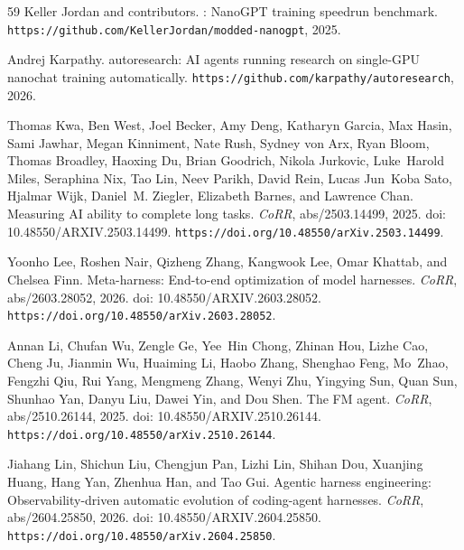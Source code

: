 \documentclass{llmxive}
\providecommand{\url}[1]{\texttt{#1}}
\providecommand{\doi}[1]{doi: #1}
\begin{document}
\begin{thebibliography}{59}
Keller Jordan and contributors.
: {NanoGPT} training speedrun benchmark.
\newblock \url{https://github.com/KellerJordan/modded-nanogpt}, 2025.

Andrej Karpathy.
\newblock autoresearch: {AI} agents running research on single-{GPU} nanochat training automatically.
\newblock \url{https://github.com/karpathy/autoresearch}, 2026.

Thomas Kwa, Ben West, Joel Becker, Amy Deng, Katharyn Garcia, Max Hasin, Sami Jawhar, Megan Kinniment, Nate Rush, Sydney von Arx, Ryan Bloom, Thomas Broadley, Haoxing Du, Brian Goodrich, Nikola Jurkovic, Luke~Harold Miles, Seraphina Nix, Tao Lin, Neev Parikh, David Rein, Lucas Jun~Koba Sato, Hjalmar Wijk, Daniel~M. Ziegler, Elizabeth Barnes, and Lawrence Chan.
\newblock Measuring {AI} ability to complete long tasks.
\newblock \emph{CoRR}, abs/2503.14499, 2025.
\newblock \doi{10.48550/ARXIV.2503.14499}.
\newblock \url{https://doi.org/10.48550/arXiv.2503.14499}.

Yoonho Lee, Roshen Nair, Qizheng Zhang, Kangwook Lee, Omar Khattab, and Chelsea Finn.
\newblock Meta-harness: End-to-end optimization of model harnesses.
\newblock \emph{CoRR}, abs/2603.28052, 2026.
\newblock \doi{10.48550/ARXIV.2603.28052}.
\newblock \url{https://doi.org/10.48550/arXiv.2603.28052}.

Annan Li, Chufan Wu, Zengle Ge, Yee~Hin Chong, Zhinan Hou, Lizhe Cao, Cheng Ju, Jianmin Wu, Huaiming Li, Haobo Zhang, Shenghao Feng, Mo~Zhao, Fengzhi Qiu, Rui Yang, Mengmeng Zhang, Wenyi Zhu, Yingying Sun, Quan Sun, Shunhao Yan, Danyu Liu, Dawei Yin, and Dou Shen.
\newblock The {FM} agent.
\newblock \emph{CoRR}, abs/2510.26144, 2025.
\newblock \doi{10.48550/ARXIV.2510.26144}.
\newblock \url{https://doi.org/10.48550/arXiv.2510.26144}.

Jiahang Lin, Shichun Liu, Chengjun Pan, Lizhi Lin, Shihan Dou, Xuanjing Huang, Hang Yan, Zhenhua Han, and Tao Gui.
\newblock Agentic harness engineering: Observability-driven automatic evolution of coding-agent harnesses.
\newblock \emph{CoRR}, abs/2604.25850, 2026.
\newblock \doi{10.48550/ARXIV.2604.25850}.
\newblock \url{https://doi.org/10.48550/arXiv.2604.25850}.


\end{thebibliography}
\end{document}
